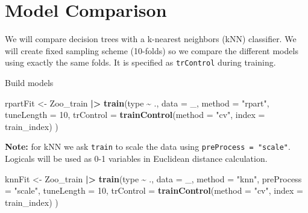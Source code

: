 \documentclass[
  notitlepage]{book}
\newenvironment{Shaded}{\begin{snugshade}}{\end{snugshade}}
\newcommand{\DataTypeTok}[1]{\textcolor[rgb]{0.13,0.29,0.53}{#1}}
\newcommand{\DecValTok}[1]{\textcolor[rgb]{0.00,0.00,0.81}{#1}}
\newcommand{\ErrorTok}[1]{\textcolor[rgb]{0.64,0.00,0.00}{\textbf{#1}}}
\newcommand{\KeywordTok}[1]{\textcolor[rgb]{0.13,0.29,0.53}{\textbf{#1}}}
\newcommand{\NormalTok}[1]{#1}
\newcommand{\OperatorTok}[1]{\textcolor[rgb]{0.81,0.36,0.00}{\textbf{#1}}}
\newcommand{\OtherTok}[1]{\textcolor[rgb]{0.56,0.35,0.01}{#1}}
\newcommand{\StringTok}[1]{\textcolor[rgb]{0.31,0.60,0.02}{#1}}
\begin{document}
\hypertarget{model-comparison}{%
\section{Model Comparison}\label{model-comparison}}

We will compare decision trees with a k-nearest neighbors (kNN)
classifier. We will create fixed sampling scheme (10-folds) so we
compare the different models using exactly the same folds. It is
specified as \texttt{trControl} during training.

\begin{Shaded}
\end{Shaded}

Build models

\begin{Shaded}
\begin{Highlighting}[]
\NormalTok{rpartFit \textless{}{-}}\StringTok{ }\NormalTok{Zoo\_train }\OperatorTok{|}\ErrorTok{\textgreater{}}\StringTok{ }
\StringTok{  }\KeywordTok{train}\NormalTok{(type }\OperatorTok{\textasciitilde{}}\StringTok{ }\NormalTok{.,}
        \DataTypeTok{data =}\NormalTok{ \_,}
        \DataTypeTok{method =} \StringTok{"rpart"}\NormalTok{,}
        \DataTypeTok{tuneLength =} \DecValTok{10}\NormalTok{,}
        \DataTypeTok{trControl =} \KeywordTok{trainControl}\NormalTok{(}\DataTypeTok{method =} \StringTok{"cv"}\NormalTok{, }
                                 \DataTypeTok{index =}\NormalTok{ train\_index)}
\NormalTok{  )}
\end{Highlighting}
\end{Shaded}

\textbf{Note:} for kNN we ask \texttt{train} to scale the data using
\texttt{preProcess\ =\ "scale"}. Logicals will be used as 0-1 variables in
Euclidean distance calculation.

\begin{Shaded}
\begin{Highlighting}[]
\NormalTok{knnFit \textless{}{-}}\StringTok{ }\NormalTok{Zoo\_train }\OperatorTok{|}\ErrorTok{\textgreater{}}\StringTok{ }
\StringTok{  }\KeywordTok{train}\NormalTok{(type }\OperatorTok{\textasciitilde{}}\StringTok{ }\NormalTok{.,}
        \DataTypeTok{data =}\NormalTok{ \_,}
        \DataTypeTok{method =} \StringTok{"knn"}\NormalTok{,}
        \DataTypeTok{preProcess =} \StringTok{"scale"}\NormalTok{,}
          \DataTypeTok{tuneLength =} \DecValTok{10}\NormalTok{,}
          \DataTypeTok{trControl =} \KeywordTok{trainControl}\NormalTok{(}\DataTypeTok{method =} \StringTok{"cv"}\NormalTok{, }
                                   \DataTypeTok{index =}\NormalTok{ train\_index)}
\NormalTok{  )}
\end{Highlighting}
\end{Shaded}
\end{document}

